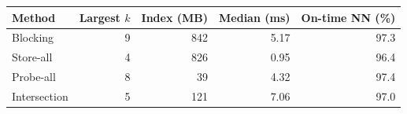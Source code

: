 \begin{tabular}{lrrrr}
\toprule
Method & Largest $k$ & Index (MB) & Median (ms) & On-time NN (\%)\\
\midrule
Blocking & 9 & 842 & 5.17 & 97.3\\
Store-all & 4 & 826 & 0.95 & 96.4\\
Probe-all & 8 & 39 & 4.32 & 97.4\\
Intersection & 5 & 121 & 7.06 & 97.0\\
\bottomrule
\end{tabular}
